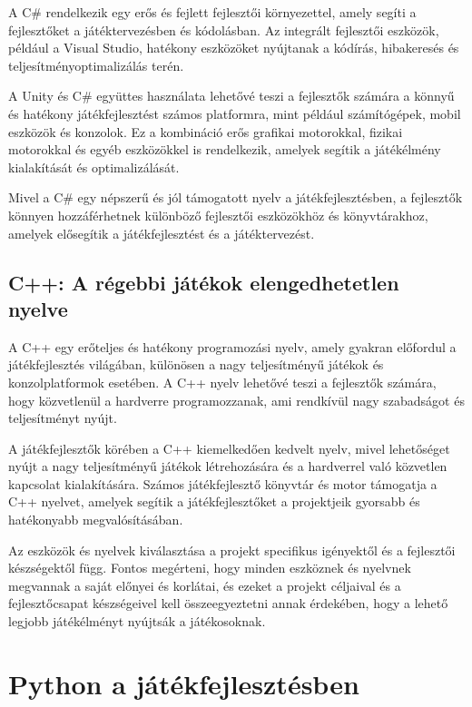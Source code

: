 A C\# rendelkezik egy erős és fejlett fejlesztői környezettel, amely segíti a fejlesztőket a játéktervezésben és kódolásban. Az integrált fejlesztői eszközök, például a Visual Studio, hatékony eszközöket nyújtanak a kódírás, hibakeresés és teljesítményoptimalizálás terén.

A Unity és C\# együttes használata lehetővé teszi a fejlesztők számára a könnyű és hatékony játékfejlesztést számos platformra, mint például számítógépek, mobil eszközök és konzolok. Ez a kombináció erős grafikai motorokkal, fizikai motorokkal és egyéb eszközökkel is rendelkezik, amelyek segítik a játékélmény kialakítását és optimalizálását.

Mivel a C\# egy népszerű és jól támogatott nyelv a játékfejlesztésben, a fejlesztők könnyen hozzáférhetnek különböző fejlesztői eszközökhöz és könyvtárakhoz, amelyek elősegítik a játékfejlesztést és a játéktervezést. \cite{csharp-doc}
\subsection{C++: A régebbi játékok elengedhetetlen nyelve}

\indent \indent A C++ egy erőteljes és hatékony programozási nyelv, amely gyakran előfordul a játékfejlesztés világában, különösen a nagy teljesítményű játékok és konzolplatformok esetében. A C++ nyelv lehetővé teszi a fejlesztők számára, hogy közvetlenül a hardverre programozzanak, ami rendkívül nagy szabadságot és teljesítményt nyújt.

A játékfejlesztők körében a C++ kiemelkedően kedvelt nyelv, mivel lehetőséget nyújt a nagy teljesítményű játékok létrehozására és a hardverrel való közvetlen kapcsolat kialakítására. Számos játékfejlesztő könyvtár és motor támogatja a C++ nyelvet, amelyek segítik a játékfejlesztőket a projektjeik gyorsabb és hatékonyabb megvalósításában.

Az eszközök és nyelvek kiválasztása a projekt specifikus igényektől és a fejlesztői készségektől függ. Fontos megérteni, hogy minden eszköznek és nyelvnek megvannak a saját előnyei és korlátai, és ezeket a projekt céljaival és a fejlesztőcsapat készségeivel kell összeegyeztetni annak érdekében, hogy a lehető legjobb játékélményt nyújtsák a játékosoknak.\cite{cpp-doc}


\section{Python a játékfejlesztésben}

